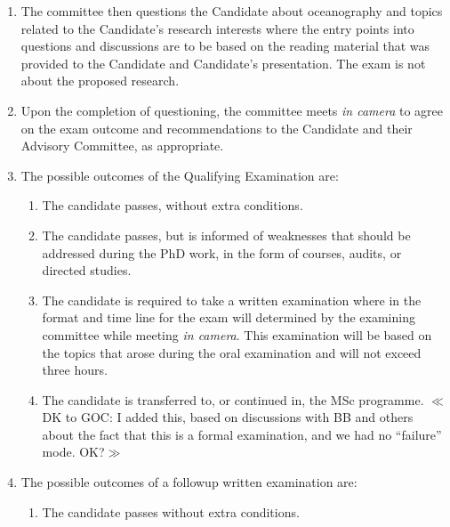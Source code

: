 \documentclass[12pt]{article}
\newcommand{\vote}[1]{\color{voteColor}$\ll$#1$\gg$\color{black}\marginpar[$\gg$ vote]{$\ll$ vote}\index{$>>>>$VOTE$<<<<$}}
\newcommand{\advcom}{\index{Committees!Advisory}Advisory Committee\xspace}
\begin{document}
\begin{enumerate}
    \item The committee then questions the Candidate about oceanography and
        topics related to the Candidate’s research interests where the entry
        points into questions and discussions are to be based on the reading
        material that was provided to the Candidate and Candidate’s
        presentation. The exam is not about the proposed research.

    \item Upon the completion of questioning, the committee meets \emph{in
        camera} to agree on the exam outcome and recommendations to the
        Candidate and their \advcom, as appropriate.

    \item The possible outcomes of the Qualifying Examination are:

        \begin{enumerate}
            \item The candidate passes, without extra conditions.

            \item The candidate passes, but is informed of weaknesses that
                should be addressed during the PhD work, in the form of
                courses, audits, or directed studies.

            \item The candidate is required to take a written examination where
                in the format and time line for the exam will determined by the
                examining committee while meeting \emph{in camera}. This
                examination will be based on the topics that arose during the
                oral examination and will not exceed three hours. 
                

            \item The candidate is transferred to, or continued in, the MSc
                programme.  \vote{DK to GOC: I added this, based on discussions
                with BB and others about the fact that this is a formal
                examination, and we had no ``failure'' mode.  OK?}

        \end{enumerate}

    \item The possible outcomes of a followup written examination are:

        \begin{enumerate}

            \item The candidate passes without extra conditions.


\end{enumerate}
\end{enumerate}
\end{document}
